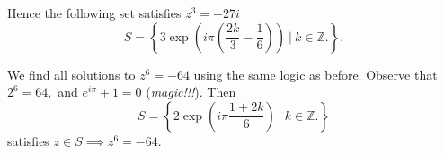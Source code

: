 \documentclass[letter]{article}
\newenvironment{menumerate}{%
  \edef\backupindent{\the\parindent}%
  \enumerate%
  \setlength{\parindent}{\backupindent}%
}{\endenumerate}
\begin{document}
\begin{menumerate}
	Hence the following set satisfies $z^3 = -27i$
	\begin{equation*}
		S = \left\{3\exp\left({i\pi\left(\frac{2k}{3} - \frac{1}{6}\right)}\right)\ \Big|\ k \in \mathbb{Z}.\right\}.
	\end{equation*}

	\setcounter{enumi}{20}
	\item We find all solutions to $z^6 = -64$ using the same logic as before. Observe that $2^6 = 64,$ and $e^{i\pi} +1 = 0$ (\emph{magic!!!}). Then
	\begin{equation}
		S = \left\{2\exp\left({i\pi\frac{1 + 2k}{6}}\right)\ \Big|\ k \in \mathbb{Z}.\right\}
	\end{equation}
	satisfies $z \in S \implies z^6 = -64.$


\end{menumerate}

\end{document}
